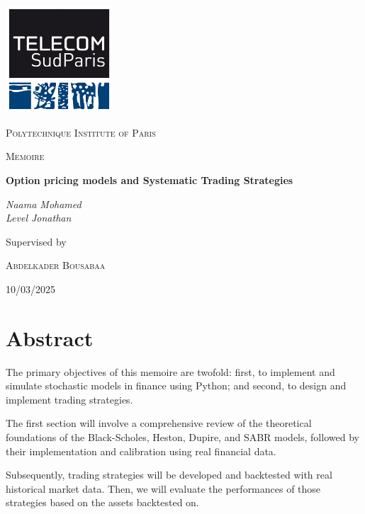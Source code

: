 \documentclass[11pt, oneside, a4paper, titlepage]{report}
\begin{document}
\begin{titlepage}
    \centering
    \includegraphics[width=0.3\textwidth]{logo-tsp.jpg}\par\vspace{1cm}
    {\scshape\LARGE Polytechnique Institute of Paris \par}
    \vspace{1cm}
    {\scshape\Large Memoire\par}
    \vspace{1.5cm}
    {\huge\bfseries Option pricing models and Systematic Trading Strategies \par}
    \vspace{2cm}
    {\Large\itshape Naama Mohamed \\ Level Jonathan \par}
    \vfill
    Supervised by\par
    \textsc{\Large Abdelkader Bousabaa}
    \vfill
    {\large 10/03/2025 \par}
\end{titlepage}

\tableofcontents
\newpage

\chapter*{Abstract}
The primary objectives of this memoire are twofold: first, to implement and simulate stochastic models in finance using Python; and second, to design and implement trading strategies. 

The first section will involve a comprehensive review of the theoretical foundations of the Black-Scholes, Heston, Dupire, and SABR models, followed by their implementation and calibration using real financial data. 

Subsequently, trading strategies will be developed and backtested with real historical market data. Then, we will evaluate the performances of those strategies based on the assets backtested on.
\end{document}
